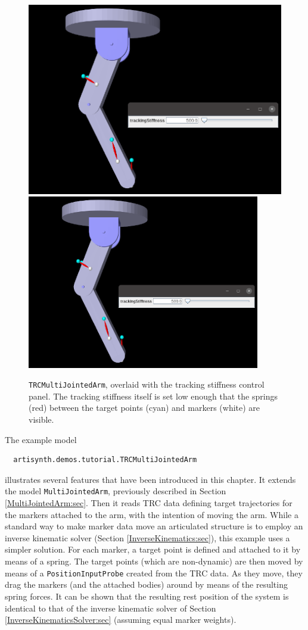 \begin{figure}[t]
\begin{center}
\iflatexml
 \includegraphics[]{images/TRCMultiJointedArm}
\else
 \includegraphics[width=4in]{images/TRCMultiJointedArm}
\fi
\end{center}
\caption{{\tt TRCMultiJointedArm}, overlaid with the tracking stiffness
control panel. The tracking stiffness itself is set low enough that
the springs (red) between the target points (cyan) and markers (white)
are visible.}
\label{TRCMultiJointedArm:fig}
\end{figure}

The example model
%
\begin{verbatim}
  artisynth.demos.tutorial.TRCMultiJointedArm
\end{verbatim}
%
illustrates several features that have been introduced in this chapter.  It
extends the model {\tt MultiJointedArm}, previously described in
Section \ref{MultiJointedArm:sec}. Then it reads TRC data defining target
trajectories for the markers attached to the arm, with the intention of moving
the arm. While a standard way to make marker data move an articulated structure
is to employ an inverse kinematic solver (Section \ref{InverseKinematics:sec}),
this example uses a simpler solution. For each marker, a target point is
defined and attached to it by means of a spring. The target points (which are
non-dynamic) are then moved by means of a {\tt PositionInputProbe} created from
the TRC data. As they move, they drag the markers (and the attached bodies)
around by means of the resulting spring forces. It can be shown that the
resulting rest position of the system is identical to that of the inverse
kinematic solver of Section \ref{InverseKinematicsSolver:sec} (assuming equal
marker weights).

